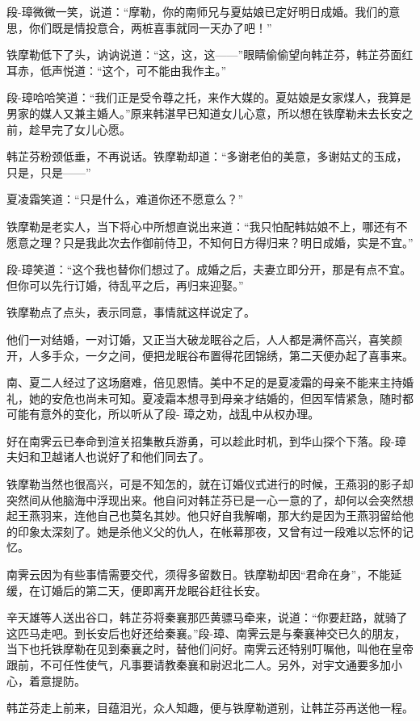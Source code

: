 \documentclass[12pt,oneside]{book}
\begin{document}
段-璋微微一笑，说道：``摩勒，你的南师兄与夏姑娘已定好明日成婚。我们的意思，你们既是情投意合，两桩喜事就同一天办了吧！''

铁摩勒低下了头，讷讷说道：``这，这，这------''眼睛偷偷望向韩芷芬，韩芷芬面红耳赤，低声悦道：``这个，可不能由我作主。''

段-璋哈哈笑道：``我们正是受令尊之托，来作大媒的。夏姑娘是女家煤人，我算是男家的媒人又兼主婚人。''原来韩湛早已知道女儿心意，所以想在铁摩勒未去长安之前，趁早完了女儿心愿。

韩芷芬粉颈低垂，不再说话。铁摩勒却道：``多谢老伯的美意，多谢姑丈的玉成，只是，只是------''

夏凌霜笑道：``只是什么，难道你还不愿意么？''

铁摩勒是老实人，当下将心中所想直说出来道：``我只怕配韩姑娘不上，哪还有不愿意之理？只是我此次去作御前侍卫，不知何日方得归来？明日成婚，实是不宜。''

段-璋笑道：``这个我也替你们想过了。成婚之后，夫妻立即分开，那是有点不宜。但你可以先行订婚，待乱平之后，再归来迎娶。''

铁摩勒点了点头，表示同意，事情就这样说定了。

他们一对结婚，一对订婚，又正当大破龙眠谷之后，人人都是满怀高兴，喜笑颜开，人多手众，一夕之间，便把龙眠谷布置得花团锦绣，第二天便办起了喜事来。

南、夏二人经过了这场磨难，倍见恩情。美中不足的是夏凌霜的母亲不能来主持婚礼，她的安危也尚未可知。夏凌霜本想寻到母亲才结婚的，但因军情紧急，随时都可能有意外的变化，所以听从了段-
璋之劝，战乱中从权办理。

好在南霁云已奉命到渲关招集散兵游勇，可以趁此时机，到华山探个下落。段-璋夫妇和卫越诸人也说好了和他们同去了。

铁摩勒当然也很高兴，可是不知怎的，就在订婚仪式进行的时候，王燕羽的影子却突然间从他脑海中浮现出来。他自问对韩芷芬已是一心一意的了，却何以会突然想起王燕羽来，连他自己也莫名其妙。他只好自我解嘲，那大约是因为王燕羽留给他的印象太深刻了。她是杀他义父的仇人，在帐幕那夜，又曾有过一段难以忘怀的记忆。

南霁云因为有些事情需要交代，须得多留数日。铁摩勒却因``君命在身''，不能延缓，在订婚后的第二天，便即离开龙眠谷赶往长安。

辛天雄等人送出谷口，韩芷芬将秦襄那匹黄骠马牵来，说道：``你要赶路，就骑了这匹马走吧。到长安后也好还给秦襄。''段-璋、南霁云是与秦襄神交已久的朋友，当下也托铁摩勒在见到秦襄之时，替他们问好。南霁云还特别叮嘱他，叫他在皇帝跟前，不可任性使气，凡事要请教秦襄和尉迟北二人。另外，对宇文通要多加小心，着意提防。

韩芷芬走上前来，目蕴泪光，众人知趣，便与铁摩勒道别，让韩芷芬再送他一程。
\end{document}
